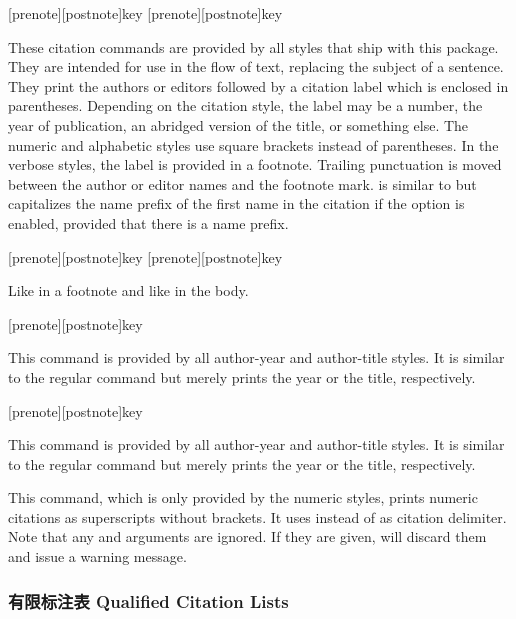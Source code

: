 \begin{ltxsyntax}

[prenote][postnote]{key}
[prenote][postnote]{key}

These citation commands are provided by all styles that ship with this package. They are intended for use in the flow of text, replacing the subject of a sentence. They print the authors or editors followed by a citation label which is enclosed in parentheses. Depending on the citation style, the label may be a number, the year of publication, an abridged version of the title, or something else. The numeric and alphabetic styles use square brackets instead of parentheses. In the verbose styles, the label is provided in a footnote. Trailing punctuation is moved between the author or editor names and the footnote mark.  is similar to  but capitalizes the name prefix of the first name in the citation if the  option is enabled, provided that there is a name prefix.

[prenote][postnote]{key}
[prenote][postnote]{key}

Like  in a footnote and like  in the body.

[prenote][postnote]{key}

This command is provided by all author-year and author-title styles. It is similar to the regular  command but merely prints the year or the title, respectively.

[prenote][postnote]{key}

This command is provided by all author-year and author-title styles. It is similar to the regular  command but merely prints the year or the title, respectively.


This command, which is only provided by the numeric styles, prints numeric citations as superscripts without brackets. It uses  instead of  as citation delimiter. Note that any  and  arguments are ignored. If they are given,  will discard them and issue a warning message.

\end{ltxsyntax}

\subsubsection{有限标注表 Qualified Citation Lists}
\label{use:cit:mlt}

